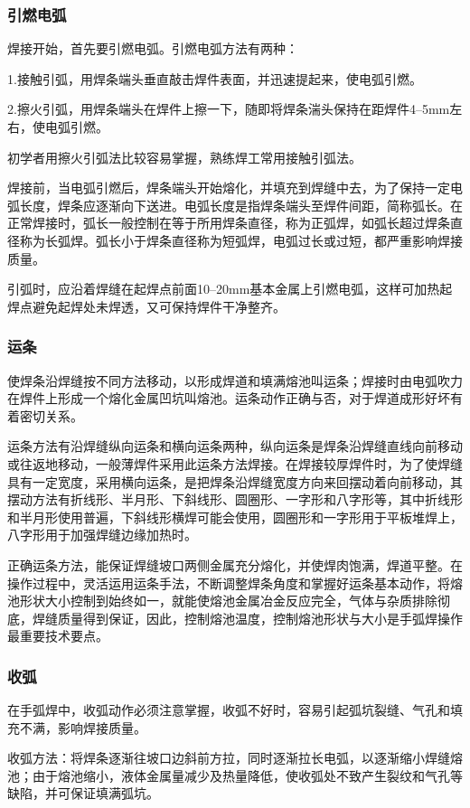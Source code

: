 \documentclass{ctexbook}
\begin{document}
\subsubsection{引燃电弧}
焊接开始，首先要引燃电弧。引燃电弧方法有两种：

1.接触引弧，用焊条端头垂直敲击焊件表面，并迅速提起来，使电弧引燃。

2.擦火引弧，用焊条端头在焊件上擦一下，随即将焊条湍头保持在距焊件4--5mm左右，使电弧引燃。

初学者用擦火引弧法比较容易掌握，熟练焊工常用接触引弧法。

焊接前，当电弧引燃后，焊条端头开始熔化，并填充到焊缝中去，为了保持一定电弧长度，焊条应逐渐向下送进。电弧长度是指焊条端头至焊件间距，简称弧长。在正常焊接时，弧长一般控制在等于所用焊条直径，称为正弧焊，如弧长超过焊条直径称为长弧焊。弧长小于焊条直径称为短弧焊，电弧过长或过短，都严重影响焊接质量。

引弧时，应沿着焊缝在起焊点前面10--20mm基本金属上引燃电弧，这样可加热起焊点避免起焊处未焊透，又可保持焊件干净整齐。
\subsubsection{运条}
使焊条沿焊缝按不同方法移动，以形成焊道和填满熔池叫运条；焊接时由电弧吹力在焊件上形成一个熔化金属凹坑叫熔池。运条动作正确与否，对于焊道成形好坏有着密切关系。

运条方法有沿焊缝纵向运条和横向运条两种，纵向运条是焊条沿焊缝直线向前移动或往返地移动，一般薄焊件采用此运条方法焊接。在焊接较厚焊件时，为了使焊缝具有一定宽度，采用横向运条，是把焊条沿焊缝宽度方向来回摆动着向前移动，其摆动方法有折线形、半月形、下斜线形、圆圈形、一字形和八字形等，其中折线形和半月形使用普遍，下斜线形横焊可能会使用，圆圈形和一字形用于平板堆焊上，八字形用于加强焊缝边缘加热时。

正确运条方法，能保证焊缝坡口两侧金属充分熔化，并使焊肉饱满，焊道平整。在操作过程中，灵活运用运条手法，不断调整焊条角度和掌握好运条基本动作，将熔池形状大小控制到始终如一，就能使熔池金属冶金反应完全，气体与杂质排除彻底，焊缝质量得到保证，因此，控制熔池温度，控制熔池形状与大小是手弧焊操作最重要技术要点。
\subsubsection{收弧}
在手弧焊中，收弧动作必须注意掌握，收弧不好时，容易引起弧坑裂缝、气孔和填充不满，影响焊接质量。

收弧方法：将焊条逐渐往坡口边斜前方拉，同时逐渐拉长电弧，以逐渐缩小焊缝熔池；由于熔池缩小，液体金属量减少及热量降低，使收弧处不致产生裂纹和气孔等缺陷，并可保证填满弧坑。
\end{document}
